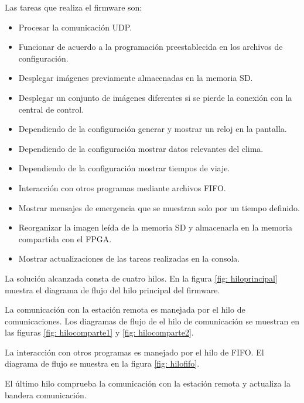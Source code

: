 Las tareas que realiza el firmware son:
\begin{itemize}
\item Procesar la comunicación UDP.
\item Funcionar de acuerdo a la programación preestablecida en los archivos de configuración.
\item Desplegar imágenes previamente almacenadas en la memoria SD.  
\item Desplegar un conjunto de imágenes diferentes si se pierde la conexión con la central de control.
\item Dependiendo de la configuración generar y mostrar un reloj en la pantalla.
\item Dependiendo de la configuración mostrar datos relevantes del clima.
\item Dependiendo de la configuración mostrar tiempos de viaje.
\item Interacción con otros programas mediante archivos FIFO.
\item Mostrar mensajes de emergencia que se muestran solo por un tiempo definido.
\item Reorganizar la imagen leída de la memoria SD y almacenarla en la memoria compartida con el FPGA.
\item Mostrar actualizaciones de las tareas realizadas en la consola.
\end{itemize}

La solución alcanzada consta de cuatro hilos. En la figura \ref{fig: hiloprincipal} muestra el diagrama de flujo del hilo principal del firmware. 

La comunicación con la estación remota es manejada por el hilo de comunicaciones. Los diagramas de flujo de el hilo de comunicación se muestran en las figuras \ref{fig: hilocomparte1} y \ref{fig: hilocomparte2}.

La interacción con otros programas es manejado por el hilo de FIFO. El diagrama de flujo se muestra en la figura \ref{fig: hilofifo}.

El último hilo comprueba la comunicación con la estación remota y actualiza la bandera comunicación.

